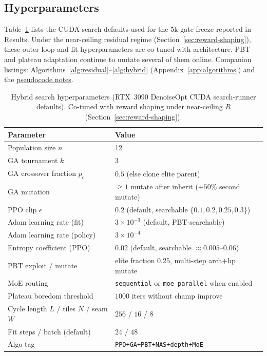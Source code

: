 \subsection{Hyperparameters}
\label{sec:hyperparams}

Table~\ref{tab:hyperparams} lists the CUDA search defaults used for the $5$k-gate freeze reported in Results.
Under the near-ceiling residual regime (Section~\ref{sec:reward-shaping}), these outer-loop and fit hyperparameters are co-tuned with architecture. PBT and plateau adaptation continue to mutate several of them online.
Companion listings: Algorithms~\ref{alg:residual}--\ref{alg:hybrid} (Appendix~\ref{app:algorithms}) and the \href{https://github.com/reeldemo/denoise-opt-meta/blob/master/docs/PSEUDOCODE.md}{pseudocode notes}.

\begin{table}[t]
  \centering
  \small
  \caption{Hybrid search hyperparameters (RTX~3090 DenoiseOpt CUDA search-runner defaults). Co-tuned with reward shaping under near-ceiling $R$ (Section~\ref{sec:reward-shaping}).}
  \label{tab:hyperparams}
  \setlength{\tabcolsep}{3pt}
  \begin{tabular}{@{}lp{}@{}}
    \toprule
    Parameter & Value \\
    \midrule
    Population size $n$ & 12 \\
    GA tournament $k$ & 3 \\
    GA crossover fraction $p_c$ & $0.5$ (else clone elite parent) \\
    GA mutation & $\ge 1$ mutate after inherit ($+50\%$ second mutate) \\
    PPO clip $\epsilon$ & $0.2$ (default, searchable $\{0.1,0.2,0.25,0.3\}$) \\
    Adam learning rate (fit) & $3{\times}10^{-3}$ (default, PBT-searchable) \\
    Adam learning rate (policy) & $3{\times}10^{-4}$ \\
    Entropy coefficient (PPO) & $0.02$ (default, searchable $\approx 0.005$--$0.06$) \\
    PBT exploit / mutate & elite fraction $0.25$, multi-step arch+hp mutate \\
    MoE routing & \texttt{sequential} or \texttt{moe\_parallel} when enabled \\
    Plateau boredom threshold & $1000$ iters without champ improve \\
    Cycle length $L$ / tiles $N$ / seam $W$ & $256$ / $16$ / $8$ \\
    Fit steps / batch (default) & $24$ / $48$ \\
    Algo tag & \texttt{PPO+GA+PBT+NAS+depth+MoE} \\
    \bottomrule
  \end{tabular}
\end{table}
